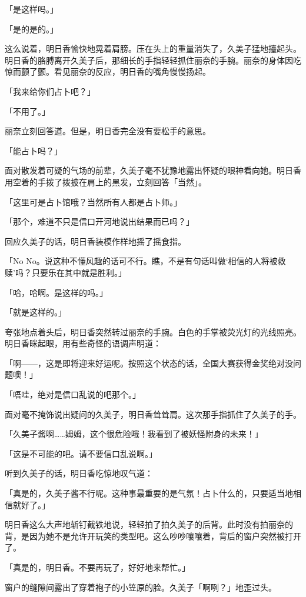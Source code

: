 \documentclass[UTF8]{ctexart}
\begin{document}
    「是这样吗。」

    「是的是的。」

    这么说着，明日香愉快地晃着肩膀。压在头上的重量消失了，久美子猛地擡起头。明日香的胳膊离开久美子后，那细长的手指轻轻抓住丽奈的手腕。丽奈的身体因吃惊而颤了颤。看见丽奈的反应，明日香的嘴角慢慢扬起。

    「我来给你们占卜吧？」

    「不用了。」

    丽奈立刻回答道。但是，明日香完全没有要松手的意思。

    「能占卜吗？」

    面对散发着可疑的气场的前辈，久美子毫不犹豫地露出怀疑的眼神看向她。明日香用空着的手拨了拨披在肩上的黑发，立刻回答「当然」。

    「这里可是占卜馆哦？当然所有人都是占卜师。」

    「那个，难道不只是信口开河地说出结果而已吗？」

    回应久美子的话，明日香装模作样地摇了摇食指。

    「No No。说这种不懂风趣的话可不行。瞧，不是有句话叫做‘相信的人将被救赎’吗？只要乐在其中就是胜利。」

    「哈，哈啊。是这样的吗。」

    「就是这样的。」

    夸张地点着头后，明日香突然转过丽奈的手腕。白色的手掌被荧光灯的光线照亮。明日香眯起眼，用有些奇怪的语调声明道：

    「啊——，这是即将迎来好运呢。按照这个状态的话，全国大赛获得金奖绝对没问题噢！」

    「唔哇，绝对是信口乱说的吧那个。」

    面对毫不掩饰说出疑问的久美子，明日香耸耸肩。这次那手指抓住了久美子的手。

    「久美子酱啊……姆姆，这个很危险哦！我看到了被妖怪附身的未来！」

    「这是不可能的吧。请不要信口乱说啊。」

    听到久美子的话，明日香吃惊地叹气道：

    「真是的，久美子酱不行呢。这种事最重要的是气氛！占卜什么的，只要适当地相信就好了。」

    明日香这么大声地斩钉截铁地说，轻轻拍了拍久美子的后背。此时没有拍丽奈的背，是因为她不是允许开玩笑的类型吧。这么吵吵嚷嚷着，背后的窗户突然被打开了。

    「真是的，明日香。不要再玩了，好好地来帮忙。」

    窗户的缝隙间露出了穿着袍子的小笠原的脸。久美子「啊咧？」地歪过头。
\end{document}
